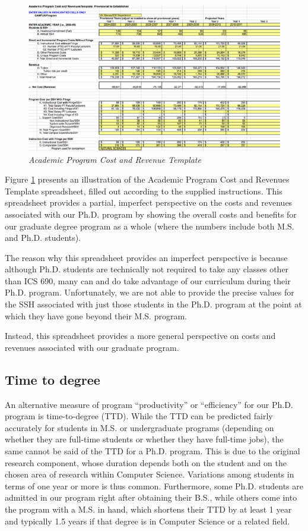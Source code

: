 \documentclass[12pt]{article}
\begin{document}
\begin{figure}[ht]
  \center
  \includegraphics{costs.eps}
  \caption{\em \small Academic Program Cost and Revenue Template}
  \label{fig:costs}
\end{figure} 

Figure \ref{fig:costs} presents an illustration of the Academic Program
Cost and Revenues Template spreadsheet, filled out according to the
supplied instructions.  This spreadsheet provides a partial, imperfect
perspective on the costs and revenues associated with our Ph.D. program by
showing the overall costs and benefits for our graduate degree program as a
whole (where the numbers include both M.S. and Ph.D. students).

The reason why this spreadsheet provides an imperfect perspective is
because although Ph.D. students are technically not required to take any
classes other than ICS 690, many can and do take advantage of our
curriculum during their Ph.D. program.  Unfortunately, we are not able to
provide the precise values for the SSH associated with just those students
in the Ph.D. program at the point at which they have gone beyond their
M.S. program. 

Instead, this spreadsheet provides a more general perspective on costs and
revenues associated with our graduate program. 

\subsection{Time to degree}

An alternative measure of program ``productivity'' or ``efficiency'' for
our Ph.D. program is time-to-degree (TTD).  While the TTD can be predicted
fairly accurately for students in M.S. or undergraduate programs (depending
on whether they are full-time students or whether they have full-time
jobs), the same cannot be said of the TTD for a Ph.D. program. This is due
to the original research component, whose duration depends both on the
student and on the chosen area of research within Computer
Science. Variations among students in terms of one year or more is thus
common. Furthermore, some Ph.D.  students are admitted in our program right
after obtaining their B.S., while others come into the program with a
M.S. in hand, which shortens their TTD by at least 1 year and typically 1.5
years if that degree is in Computer Science or a related field.
\end{document}
